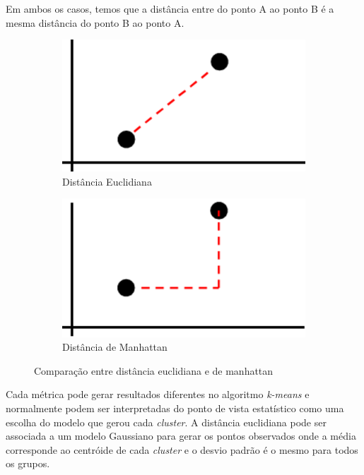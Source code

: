Em ambos os casos, temos que a distância entre do ponto A ao ponto B é a mesma distância do ponto B ao ponto A.

\begin{figure}[h]
  \centering
  \begin{subfigure}{.5\textwidth}
    \centering
    \includegraphics[scale=0.5]{figuras/euclidean.eps}
    \caption{Distância Euclidiana}
  \end{subfigure}%
  \begin{subfigure}{.5\textwidth}
    \centering
    \includegraphics[scale=0.5]{figuras/manhattan.eps}
    \caption{Distância de Manhattan}
  \end{subfigure}
  \caption{Comparação entre distância euclidiana e de manhattan}
\end{figure}

Cada métrica pode gerar resultados diferentes no algoritmo \textit{k-means} e normalmente podem ser interpretadas do ponto de vista estatístico como uma escolha do modelo que gerou cada \textit{cluster}. A distância euclidiana pode ser associada a um modelo Gaussiano para gerar os pontos observados onde a média corresponde ao centróide de cada \textit{cluster} e o desvio padrão é o mesmo para todos os grupos.
